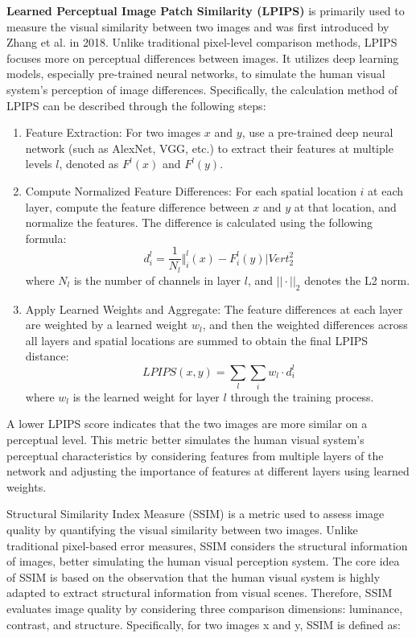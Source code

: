 \documentclass[preprint,12pt]{elsarticle}
\begin{document}
\textbf{Learned Perceptual Image Patch Similarity (LPIPS)} is primarily used to measure the visual similarity between two images and was first introduced by Zhang et al. in 2018\citep{75zhang2018unreasonable}. Unlike traditional pixel-level comparison methods, LPIPS focuses more on perceptual differences between images. It utilizes deep learning models, especially pre-trained neural networks, to simulate the human visual system's perception of image differences. Specifically, the calculation method of LPIPS can be described through the following steps:
\begin{enumerate}
    \item Feature Extraction: For two images $x$ and $y$, use a pre-trained deep neural network (such as AlexNet, VGG, etc.) to extract their features at multiple levels $l$, denoted as $F^l (x)$ and $F^l (y)$.
    \item Compute Normalized Feature Differences: For each spatial location $i$ at each layer, compute the feature difference between $x$ and $y$ at that location, and normalize the features. The difference is calculated using the following formula:
    \begin{equation}
        d_i^l = \frac{1}{N_l} \Vert_i^l(x) - F_i^l(y)|Vert_2^2
    \end{equation}
    where $N_l$ is the number of channels in layer $l$, and $||\cdot||_2$ denotes the L2 norm.
    \item Apply Learned Weights and Aggregate: The feature differences at each layer are weighted by a learned weight $w_l$, and then the weighted differences across all layers and spatial locations are summed to obtain the final LPIPS distance:
    \begin{equation}
        LPIPS(x, y) = \sum_l \sum_i w_l \cdot d_i^l
    \end{equation}
    where $w_l$ is the learned weight for layer $l$ through the training process.
\end{enumerate}

A lower LPIPS score indicates that the two images are more similar on a perceptual level. This metric better simulates the human visual system's perceptual characteristics by considering features from multiple layers of the network and adjusting the importance of features at different layers using learned weights.

\textbf{}{Structural Similarity Index Measure (SSIM)} is a metric used to assess image quality by quantifying the visual similarity between two images. Unlike traditional pixel-based error measures, SSIM considers the structural information of images, better simulating the human visual perception system. The core idea of SSIM is based on the observation that the human visual system is highly adapted to extract structural information from visual scenes. Therefore, SSIM evaluates image quality by considering three comparison dimensions: luminance, contrast, and structure. Specifically, for two images x and y, SSIM is defined as:
\end{document}
